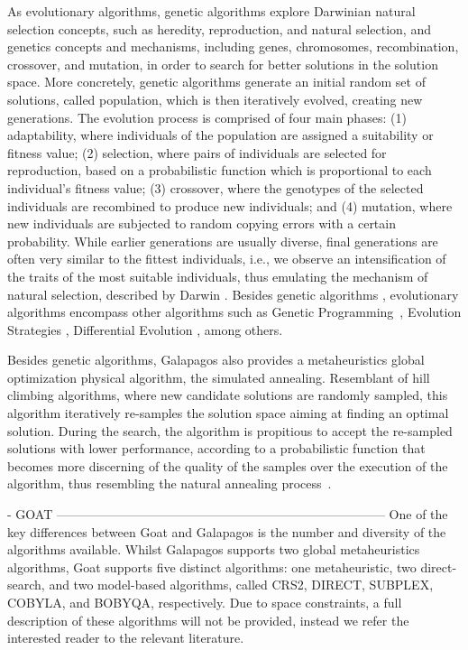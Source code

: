 As evolutionary algorithms, genetic algorithms explore Darwinian natural selection concepts, such as heredity, reproduction, and natural selection, and genetics concepts and mechanisms, including genes, chromosomes, recombination, crossover, and mutation, in order to search for better solutions in the solution space. More concretely, genetic algorithms generate an initial random set of solutions, called population, which is then iteratively evolved, creating new generations. The evolution process is comprised of four main phases: (1) adaptability, where individuals of the population are assigned a suitability or fitness value; (2) selection, where pairs of individuals are selected for reproduction, based on a probabilistic function which is proportional to each individual's fitness value; (3) crossover, where the genotypes of the selected individuals are recombined to produce new individuals; and (4) mutation, where new individuals are subjected to random copying errors with a certain probability. While earlier generations are usually diverse, final generations are often very similar to the fittest individuals, i.e., we observe an intensification of the traits of the most suitable individuals, thus emulating the mechanism of natural selection, described by Darwin \cite{Brownlee2011}. Besides genetic algorithms \cite{Golberg1989,Holland1992}, evolutionary algorithms encompass other algorithms such as Genetic Programming~\cite{Koza1992}, Evolution Strategies \cite{Schwefel1981}, Differential Evolution \cite{Storn1997}, among others. 

Besides genetic algorithms, Galapagos also provides a metaheuristics global optimization physical algorithm, the simulated annealing. Resemblant of hill climbing algorithms, where new candidate solutions are randomly sampled, this algorithm iteratively re-samples the solution space aiming at finding an optimal solution. During the search, the algorithm is propitious to accept the re-sampled solutions with lower performance, according to a probabilistic function that becomes more discerning of the quality of the samples over the execution of the algorithm, thus resembling the natural annealing process~\cite{Brownlee2011}. 


- GOAT ------------------------------------------------------------------------------
One of the key differences between Goat and Galapagos is the number and diversity of the algorithms available. Whilst Galapagos supports two global metaheuristics algorithms, Goat supports five distinct algorithms: one metaheuristic, two direct-search, and two model-based algorithms, called CRS2, DIRECT, SUBPLEX, COBYLA, and BOBYQA, respectively. Due to space constraints, a full description of these algorithms will not be provided, instead we refer the interested reader to the relevant literature.  

